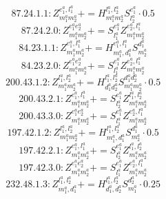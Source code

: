 \documentclass[letterpaper,10pt,fleqn,leqno,onecolumn]{article}
\begin{document}
\begin{equation} \;\;\;\;\;\;  87.24.1.1: Z^{e_{1}^{a},l_{1}^{a}}_{m_{1}^{a}m_{2}^{a}}+=H^{l_{1}^{a},l_{2}^{a}}_{m_{1}^{a}m_{2}^{a}}S^{e_{1}^{a}}_{l_{2}^{a}}\cdot 0.5 \end{equation}
\begin{equation} \;\;\;\;\;\;  87.24.2.0: Z^{e_{1}^{a}e_{2}^{a}}_{m_{1}^{a}m_{2}^{a}}+=S^{e_{1}^{a}}_{l_{1}^{a}}Z^{e_{2}^{a},l_{1}^{a}}_{m_{1}^{a}m_{2}^{a}} \end{equation}
\begin{equation} \;\;\;\;\;\;  84.23.1.1: Z^{e_{1}^{a},l_{1}^{a}}_{m_{1}^{a}m_{2}^{a}}+=H^{e_{1}^{a},l_{1}^{a}}_{m_{1}^{a},d_{1}^{a}}S^{d_{1}^{a}}_{m_{2}^{a}} \end{equation}
\begin{equation} \;\;\;\;\;\;  84.23.2.0: Z^{e_{1}^{a}e_{2}^{a}}_{m_{1}^{a}m_{2}^{a}}+=S^{e_{1}^{a}}_{l_{1}^{a}}Z^{e_{2}^{a},l_{1}^{a}}_{m_{1}^{a}m_{2}^{a}} \end{equation}
\begin{equation} \;\;\;\;\;\;  200.43.1.2: Z^{l_{1}^{a},l_{2}^{a}}_{m_{1}^{a}m_{2}^{a}}+=H^{l_{1}^{a},l_{2}^{a}}_{d_{1}^{a}d_{2}^{a}}S^{d_{1}^{a}d_{2}^{a}}_{m_{1}^{a}m_{2}^{a}}\cdot 0.5 \end{equation}
\begin{equation} \;\;\;\;\;\;  200.43.2.1: Z^{e_{1}^{a},l_{1}^{a}}_{m_{1}^{a}m_{2}^{a}}+=S^{e_{1}^{a}}_{l_{2}^{a}}Z^{l_{1}^{a},l_{2}^{a}}_{m_{1}^{a}m_{2}^{a}} \end{equation}
\begin{equation} \;\;\;\;\;\;  200.43.3.0: Z^{e_{1}^{a}e_{2}^{a}}_{m_{1}^{a}m_{2}^{a}}+=S^{e_{1}^{a}}_{l_{1}^{a}}Z^{e_{2}^{a},l_{1}^{a}}_{m_{1}^{a}m_{2}^{a}} \end{equation}
\begin{equation} \;\;\;\;\;\;  197.42.1.2: Z^{l_{1}^{a},l_{2}^{a}}_{m_{1}^{a}m_{2}^{a}}+=H^{l_{1}^{a},l_{2}^{a}}_{m_{1}^{a},d_{1}^{a}}S^{d_{1}^{a}}_{m_{2}^{a}}\cdot 0.5 \end{equation}
\begin{equation} \;\;\;\;\;\;  197.42.2.1: Z^{e_{1}^{a},l_{1}^{a}}_{m_{1}^{a}m_{2}^{a}}+=S^{e_{1}^{a}}_{l_{2}^{a}}Z^{l_{1}^{a},l_{2}^{a}}_{m_{1}^{a}m_{2}^{a}} \end{equation}
\begin{equation} \;\;\;\;\;\;  197.42.3.0: Z^{e_{1}^{a}e_{2}^{a}}_{m_{1}^{a}m_{2}^{a}}+=S^{e_{1}^{a}}_{l_{1}^{a}}Z^{e_{2}^{a},l_{1}^{a}}_{m_{1}^{a}m_{2}^{a}} \end{equation}
\begin{equation} \;\;\;\;\;\;  232.48.1.3: Z^{l_{1}^{a},l_{2}^{a}}_{m_{1}^{a},d_{1}^{a}}+=H^{l_{1}^{a},l_{2}^{a}}_{d_{1}^{a},d_{2}^{a}}S^{d_{2}^{a}}_{m_{1}^{a}}\cdot 0.25 \end{equation}
\end{document}
